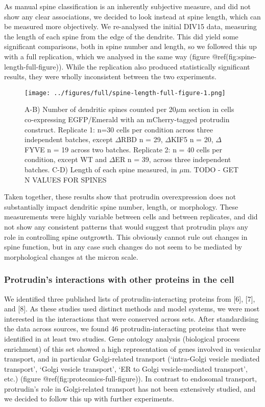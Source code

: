 \documentclass[
  12pt,
  a4paper,
]{article}
\begin{document}
As manual spine classification is an inherently subjective measure, and
did not show any clear associations, we decided to look instead at spine
length, which can be measured more objectively. We re-analysed the
initial DIV15 data, measuring the length of each spine from the edge of
the dendrite. This did yield some significant comparisons, both in spine
number and length, so we followed this up with a full replication, which
we analysed in the same way (figure @ref(fig:spine-length-full-figure)).
While the replication also produced statistically significant results,
they were wholly inconsistent between the two experiments.

\begin{figure}
\centering
\texttt{[image: ../figures/full/spine-length-full-figure-1.png]}
\caption{A-B) Number of dendritic spines counted per 20\(\mu\)m section
in cells co-expressing EGFP/Emerald with an mCherry-tagged protrudin
construct. Replicate 1: n=30 cells per condition across three
independent batches, except \(\Delta\)RBD n = 29, \(\Delta\)KIF5 n = 20,
\(\Delta\)FYVE n = 19 across two batches. Replicate 2: n = 40 cells per
condition, except WT and \(\Delta\)ER n = 39, across three independent
batches. C-D) Length of each spine measured, in \(\mu\)m. TODO - GET N
VALUES FOR SPINES}
\end{figure}

Taken together, these results show that protrudin overexpression does
not substantially impact dendritic spine number, length, or morphology.
These measurements were highly variable between cells and between
replicates, and did not show any consistent patterns that would suggest
that protrudin plays any role in controlling spine outgrowth. This
obviously cannot rule out changes in spine function, but in any case
such changes do not seem to be mediated by morphological changes at the
micron scale.

\hypertarget{protrudins-interactions-with-other-proteins-in-the-cell}{%
\subsubsection{Protrudin's interactions with other proteins in the
cell}\label{protrudins-interactions-with-other-proteins-in-the-cell}}

We identified three published lists of protrudin-interacting proteins
from {[}6{]}, {[}7{]}, and {[}8{]}. As these studies used distinct
methods and model systems, we were most interested in the interactions
that were conserved across sets. After standardising the data across
sources, we found 46 protrudin-interacting proteins that were identified
in at least two studies. Gene ontology analysis (biological process
enrichment) of this set showed a high representation of genes involved
in vesicular transport, and in particular Golgi-related transport
(`intra-Golgi vesicle mediated transport', `Golgi vesicle transport',
`ER to Golgi vesicle-mediated transport', etc.) (figure
@ref(fig:proteomics-full-figure)). In contrast to endosomal transport,
protrudin's role in Golgi-related transport has not been extensively
studied, and we decided to follow this up with further experiments.
\end{document}

